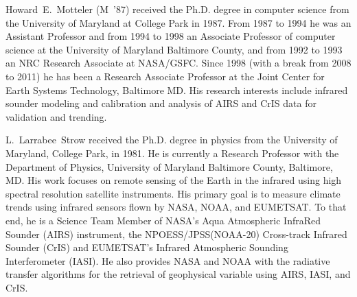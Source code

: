 \documentclass[journal]{IEEEtran}
\begin{document}
\begin{IEEEbiography}{Howard~E.~Motteler}
  (M~'87) received the Ph.D. degree in computer science from the
  University of Maryland at College Park in 1987.  From 1987 to 1994
  he was an Assistant Professor and from 1994 to 1998 an Associate
  Professor of computer science at the University of Maryland
  Baltimore County, and from 1992 to 1993 an NRC Research Associate
  at NASA/GSFC.  Since 1998 (with a break from 2008 to 2011) he has
  been a Research Associate Professor at the Joint Center for Earth
  Systems Technology, Baltimore MD.  His research interests include
  infrared sounder modeling and calibration and analysis of AIRS and
  CrIS data for validation and trending.

\end{IEEEbiography}

\vspace{-14cm}

\begin{IEEEbiography}{L.~Larrabee~Strow}
  received the Ph.D. degree in physics from the University of
  Maryland, College Park, in 1981. He is currently a Research
  Professor with the Department of Physics, University of Maryland
  Baltimore County, Baltimore, MD. His work focuses on remote
  sensing of the Earth in the infrared using high spectral
  resolution satellite instruments. His primary goal is to measure
  climate trends using infrared sensors flown by NASA, NOAA, and
  EUMETSAT. To that end, he is a Science Team Member of NASA’s Aqua
  Atmospheric InfraRed Sounder (AIRS) instrument, the
  NPOESS/JPSS(NOAA-20) Cross-track Infrared Sounder (CrIS) and
  EUMETSAT's Infrared Atmospheric Sounding Interferometer (IASI).
  He also provides NASA and NOAA with the radiative transfer
  algorithms for the retrieval of geophysical variable using AIRS,
  IASI, and CrIS.
\end{IEEEbiography}
\end{document}
